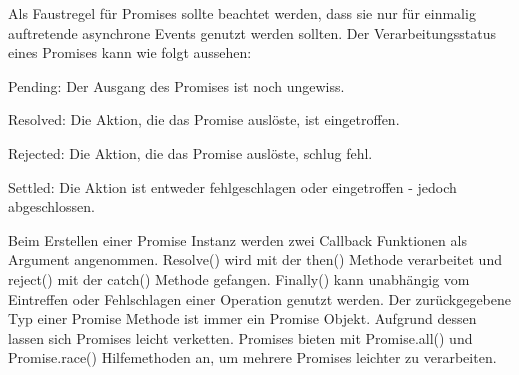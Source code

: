 \noindent
Als Faustregel für Promises sollte beachtet werden, dass sie nur für einmalig auftretende asynchrone Events genutzt werden sollten. Der Verarbeitungsstatus eines Promises kann wie folgt aussehen:

\begin{description} 
\item Pending: Der Ausgang des Promises ist noch ungewiss.
\item Resolved: Die Aktion, die das Promise auslöste, ist eingetroffen.
\item Rejected: Die Aktion, die das Promise auslöste, schlug fehl.
\item Settled: Die Aktion ist entweder fehlgeschlagen oder eingetroffen - jedoch abgeschlossen.
\end{description}

\noindent
Beim Erstellen einer Promise Instanz werden zwei Callback Funktionen als Argument angenommen. Resolve() wird mit der then() Methode verarbeitet und reject() mit der catch() Methode gefangen. Finally() kann unabhängig vom Eintreffen oder Fehlschlagen einer Operation genutzt werden. Der zurückgegebene Typ einer Promise Methode ist immer ein Promise Objekt. Aufgrund dessen lassen sich Promises leicht verketten. Promises bieten mit Promise.all() und Promise.race() Hilfemethoden an, um mehrere Promises leichter zu verarbeiten.




